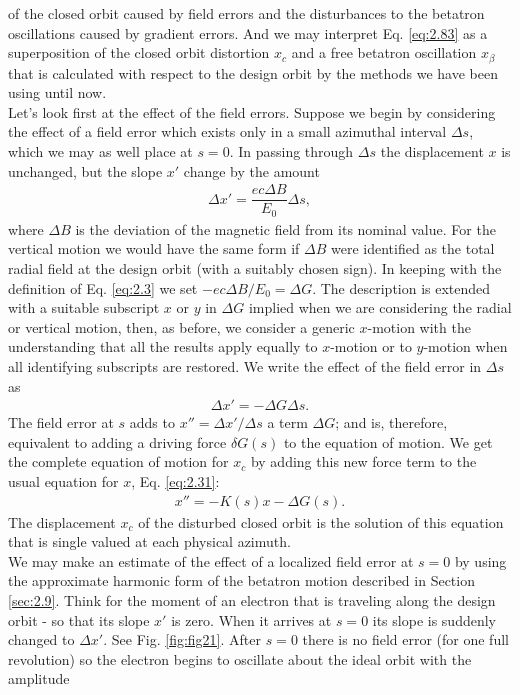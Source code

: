  of the closed orbit caused by field errors and the disturbances to the betatron oscillations
 caused by gradient errors. And we may interpret Eq. \eqref{eq:2.83} as a superposition of the closed orbit distortion $x_c$ and a free betatron oscillation $x_\beta$ that is calculated with respect to the design orbit by the methods we have been using until now.\\
Let's look first at the effect of the field errors. Suppose we begin by considering the effect of a field error which exists only in a small azimuthal interval $\Delta s$, which we may as well place at $s = 0$. In passing through $\Delta s$ the displacement $x$ is unchanged, but the slope $x'$ change by the amount
\begin{align*}
	\Delta x' = \dfrac{ec\Delta B}{E_0}\Delta s,
\end{align*}
where $\Delta B$ is the deviation of the magnetic field from its nominal value. For the vertical motion we would have the same form if $\Delta B$ were identified as the total radial field at the design orbit (with a suitably chosen sign). In keeping with the definition of Eq. \eqref{eq:2.3} we set $-ec \Delta B/E_0 = \Delta G$. The description is extended with a suitable subscript $x$ or $y$ in $\Delta G$ implied when we are considering the radial or vertical motion, then, as before, we consider a generic $x$-motion with the understanding that all the results apply equally to $x$-motion or to $y$-motion when all identifying subscripts are restored. We write the effect of the field error in $\Delta s$ as
\begin{align}\label{eq:2.84}
	\Delta x' = -\Delta G \Delta s.
\end{align}
The field error at $s$ adds to $x'' = \Delta x'/\Delta s$ a term $\Delta G$; and is, therefore, equivalent to adding a driving force $\delta G(s)$ to the equation of motion. We get the complete
equation of motion for $x_c$ by adding this new force term to the usual equation for $x$, Eq. \eqref{eq:2.31}:
\begin{align}\label{eq:2.85}
	x'' = -K(s)x -\Delta G(s).
\end{align}
The displacement $x_c$ of the disturbed closed orbit is the solution of this equation
that is single valued at each physical azimuth.\\
We may make an estimate of the effect of a localized field error at $s = 0$ by using the approximate harmonic form of the betatron motion described in Section \ref{sec:2.9}. Think for the moment of an electron that is traveling along the design orbit - so that its slope $x'$ is zero. When it arrives at $s = 0$ its slope is suddenly changed to $\Delta x'$. See Fig. \ref{fig:fig21}. After $s = 0$ there is no field error (for one full revolution) so the electron begins to oscillate about the ideal orbit with the amplitude
